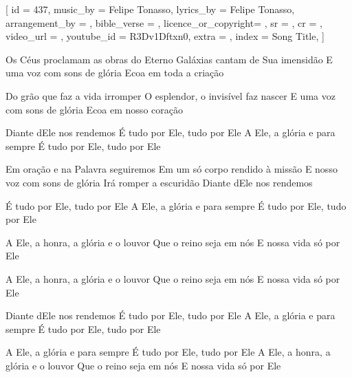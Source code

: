 [
    id                  = {437},
    music_by            = {Felipe Tonasso}, %
    lyrics_by           = {Felipe Tonasso}, %
    arrangement_by      = {}, %
    bible_verse         = {},
    licence_or_copyright= {},
    sr                  = {},
    cr                  = {},
    video_url           = {}, %
    youtube_id          = {R3Dv1Dftxn0}, %
    extra               = {},
    index               = {Song Title},
]

\beginverse
Os Céus proclamam as obras do Eterno
Galáxias cantam de Sua imensidão
E uma voz com sons de glória
Ecoa em toda a criação
\endverse

\beginverse
Do grão que faz a vida irromper
O esplendor, o invisível faz nascer
E uma voz com sons de glória
Ecoa em nosso coração
\endverse

\beginverse
Diante dEle nos rendemos
É tudo por Ele, tudo por Ele
A Ele, a glória e para sempre
É tudo por Ele, tudo por Ele
\endverse

\beginverse
Em oração e na Palavra seguiremos
Em um só corpo rendido à missão
E nosso voz com sons de glória
Irá romper a escuridão
Diante dEle nos rendemos
\endverse

\beginverse
É tudo por Ele, tudo por Ele
A Ele, a glória e para sempre
É tudo por Ele, tudo por Ele
\endverse

\beginverse
A Ele, a honra, a glória e o louvor
Que o reino seja em nós
E nossa vida só por Ele

A Ele, a honra, a glória e o louvor
Que o reino seja em nós
E nossa vida só por Ele
\endverse

\beginverse
Diante dEle nos rendemos
É tudo por Ele, tudo por Ele
A Ele, a glória e para sempre
É tudo por Ele, tudo por Ele
\endverse

\beginverse
A Ele, a glória e para sempre
É tudo por Ele, tudo por Ele
A Ele, a honra, a glória e o louvor
Que o reino seja em nós
E nossa vida só por Ele
\endverse

\beginchorus

\endchorus

\endsong
